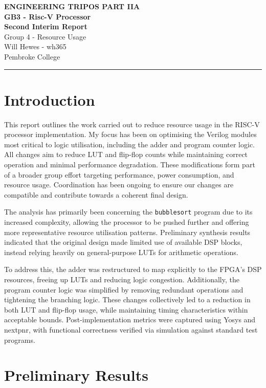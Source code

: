 \documentclass[a4paper,10pt]{article}
\renewcommand{\maketitle}{
    \begin{center}
        \LARGE \textbf{ENGINEERING TRIPOS PART IIA} \\ 
        \vspace{0.5em}
        \Large \textbf{GB3 - Risc-V Processor} \\ 
        \vspace{0.5em}
        \textbf{Second Interim Report} \\
        \large Group 4 - Resource Usage \\
        \vspace{1em}
        \large Will Hewes - wh365 \\ 
        Pembroke College \\ 
        \vspace{0.5em}
    \end{center}
}
\begin{document}

\maketitle
\hrule
\tableofcontents
\newpage

\section{Introduction}
\label{sec:Introduction}

This report outlines the work carried out to reduce resource usage 
in the RISC-V processor implementation. 
My focus has been on optimising the Verilog modules 
most critical to logic utilisation, including the adder and program counter logic. 
All changes aim to reduce LUT and flip-flop counts while maintaining 
correct operation and minimal performance degradation. 
These modifications form part of a broader group effort targeting performance, 
power consumption, and resource usage. 
Coordination has been ongoing to ensure our changes are compatible and 
contribute towards a coherent final design.

The analysis has primarily been concerning the
\texttt{bubblesort} program due to its increased complexity,
allowing the processor to be pushed further and 
offering more representative resource utilisation patterns.
Preliminary synthesis results indicated that the original design 
made limited use of available DSP blocks, 
instead relying heavily on general-purpose LUTs for arithmetic operations.

To address this, the adder was restructured to map explicitly 
to the FPGA's DSP resources, freeing up LUTs and reducing logic congestion.
Additionally, the program counter logic was simplified 
by removing redundant operations and tightening the branching logic.
These changes collectively led to a reduction in both LUT and flip-flop usage, 
while maintaining timing characteristics within acceptable bounds.
Post-implementation metrics were captured using Yosys and nextpnr, 
with functional correctness verified via simulation against standard test programs.


\section{Preliminary Results}
\label{sec:Preliminary_Results}
\end{document}
